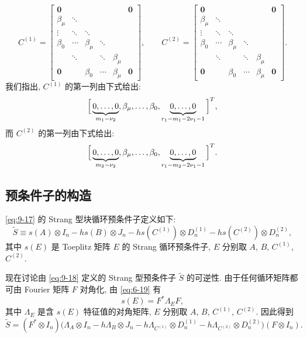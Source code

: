 \[
  C^{(1)}=\begin{bmatrix}
    \mathbf{0} & & & & & \mathbf{0}\\
    \beta_{\mu} & \ddots & & & & \\
    \vdots & \ddots & \ddots & & & \\
    \beta_0 & \cdots & \beta_{\mu} & \ddots & & \\
    & \ddots & & \ddots & \beta_{\mu} & \\
    \mathbf{0} & & \beta_0 & \cdots & \beta_{\mu} & \mathbf{0}
  \end{bmatrix},\qquad
  C^{(2)}=\begin{bmatrix}
    \mathbf{0} & & & & & \mathbf{0}\\
    \beta_{\mu} & \ddots & & & & \\
    \vdots & \ddots & \ddots & & & \\
    \beta_0 & \cdots & \beta_{\mu} & \ddots & & \\
    & \ddots & & \ddots & \beta_{\mu} & \\
    \mathbf{0} & & \beta_0 & \cdots & \beta_{\mu} & \mathbf{0}
  \end{bmatrix}.
\]
我们指出, $C^{(1)}$ 的第一列由下式给出:
\[
  \Bigl[\,\underbrace{0,\ldots,0}_{m_1-\nu_2},\beta_{\mu},\ldots,\beta_0,
  \underbrace{0,\ldots,0}_{r_1-m_1-2\nu_1-1}\,\Bigr]^T,
\]
而 $C^{(2)}$ 的第一列由下式给出:
\[
  \Bigl[\,\underbrace{0,\ldots,0}_{m_2-\nu_2},\beta_{\mu},\ldots,\beta_0,
  \underbrace{0,\ldots,0}_{r_1-m_2-2\nu_1-1}\,\Bigr]^T.
\]

\subsection{预条件子的构造}
\label{sec:9-4-2}

\eqref{eq:9-17} 的 Strang 型块循环预条件子定义如下:
\begin{equation}
  \widetilde{S}\equiv s(A)\otimes I_n-hs(B)\otimes J_n
  -hs(C^{(1)})\otimes D_n^{(1)}-hs(C^{(2)})\otimes D_n^{(2)},
  \label{eq:9-18}
\end{equation}
其中 $s(E)$ 是 Toeplitz 矩阵 $E$ 的 Strang 循环预条件子, $E$ 分别取 $A$, $B$, $C^{(1)}$, $C^{(2)}$.

现在讨论由 \eqref{eq:9-18} 定义的 Strang 型预条件子 $\widetilde{S}$ 的可逆性. 由于任何循环矩阵都可由 Fourier 矩阵 $F$ 对角化, 由 \eqref{eq:6-19} 有
\[
  s(E)=F^*\Lambda_EF,
\]
其中 $\Lambda_E$ 是含 $s(E)$ 特征值的对角矩阵, $E$ 分别取 $A$, $B$, $C^{(1)}$, $C^{(2)}$. 因此得到
\[
  \widetilde{S}=(F^*\otimes I_n)\bigl(\Lambda_A\otimes I_n-h\Lambda_B\otimes J_n
  -h\Lambda_{C^{(1)}}\otimes D_n^{(1)}-h\Lambda_{C^{(2)}}\otimes D_n^{(2)}\bigr)
  (F\otimes I_n).
\]

